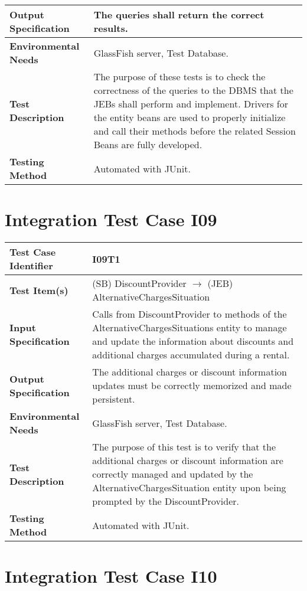 \begin{longtable}{p{} | p{}}
\hline
\hline
\textbf{Output Specification} & The queries shall return the correct results. \\
\hline
\textbf{Environmental Needs} & GlassFish server, Test Database. \\
\hline
\textbf{Test Description} & The purpose of these tests is to check the correctness of the queries to the DBMS that the JEBs shall perform and implement. Drivers for the entity beans are used to properly initialize and call their methods before the related Session Beans are fully developed. \\
\hline
\textbf{Testing Method} & Automated with JUnit. \\
\hline
\end{longtable}

\section{Integration Test Case I09}

\begin{longtable}{p{} | p{}}
\textbf{Test Case Identifier} & I09T1\\
\hline
\textbf{Test Item(s)} & (SB) DiscountProvider $\rightarrow$ (JEB) AlternativeChargesSituation \\
\hline
\textbf{Input Specification} & Calls from DiscountProvider to methods of the AlternativeChargesSituations entity to manage and update the information about discounts and additional charges accumulated during a rental.\\
\hline
\textbf{Output Specification} & The additional charges or discount information updates must be correctly memorized and made persistent. \\
\hline
\textbf{Environmental Needs} & GlassFish server, Test Database. \\
\hline
\textbf{Test Description} & The purpose of this test is to verify that the additional charges or discount information are correctly managed and updated by the AlternativeChargesSituation entity upon being prompted by the DiscountProvider. \\
\hline
\textbf{Testing Method} & Automated with JUnit. \\
\hline
\end{longtable}

\section{Integration Test Case I10}

